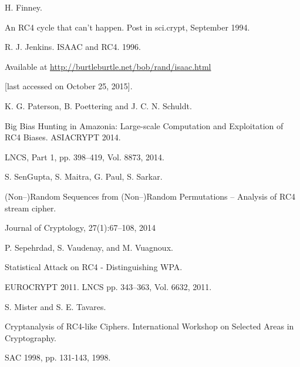 \documentclass{llncs}
\begin{document}
\begin{thebibliography}{10}




H. Finney. 

An RC4 cycle that can't happen. Post in sci.crypt, September 1994.




R. J. Jenkins. ISAAC and RC4. 1996. 

Available at \url{http://burtleburtle.net/bob/rand/isaac.html} 

[last accessed on October 25, 2015].




K. G. Paterson, B. Poettering and J. C. N. Schuldt. 

Big Bias Hunting in Amazonia: Large-scale Computation and Exploitation of RC4 Biases. ASIACRYPT 2014. 

LNCS, Part 1, pp. 398--419, Vol. 8873, 2014.




S. SenGupta, S. Maitra, G. Paul, S. Sarkar.

(Non--)Random Sequences from (Non--)Random Permutations -- Analysis of RC4 stream cipher.

Journal of Cryptology, 27(1):67--108, 2014


P. Sepehrdad, S. Vaudenay, and M. Vuagnoux. 

Statistical Attack on RC4 - Distinguishing WPA.

EUROCRYPT 2011. LNCS pp. 343--363, Vol. 6632, 2011.


S. Mister and S. E. Tavares. 

Cryptanalysis of RC4-like Ciphers. International Workshop on Selected Areas in Cryptography. 

SAC 1998, pp. 131-143, 1998.

\end{thebibliography}
\end{document}
